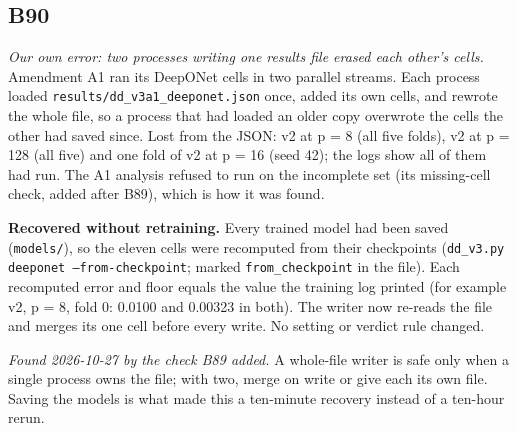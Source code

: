 \documentclass[10pt]{article}
\begin{document}
\subsection*{B90}\label{led:B90}
\begin{description}[leftmargin=0pt,itemsep=1pt]
\item[Defect.] \emph{Our own error: two processes writing one results file erased each other's cells.} Amendment A1 ran its DeepONet cells in two parallel streams. Each process loaded \texttt{results/dd\_v3a1\_deeponet.json} once, added its own cells, and rewrote the whole file, so a process that had loaded an older copy overwrote the cells the other had saved since. Lost from the JSON: v2 at p = 8 (all five folds), v2 at p = 128 (all five) and one fold of v2 at p = 16 (seed 42); the logs show all of them had run. The A1 analysis refused to run on the incomplete set (its missing-cell check, added after B89), which is how it was found.
\item[Resolution.] \textbf{Recovered without retraining.} Every trained model had been saved (\texttt{models/}), so the eleven cells were recomputed from their checkpoints (\texttt{dd\_v3.py deeponet --from-checkpoint}; marked \texttt{from\_checkpoint} in the file). Each recomputed error and floor equals the value the training log printed (for example v2, p = 8, fold 0: 0.0100 and 0.00323 in both). The writer now re-reads the file and merges its one cell before every write. No setting or verdict rule changed.
\item[Note.] \emph{Found 2026-10-27 by the check B89 added.} A whole-file writer is safe only when a single process owns the file; with two, merge on write or give each its own file. Saving the models is what made this a ten-minute recovery instead of a ten-hour rerun.
\end{description}
\end{document}
